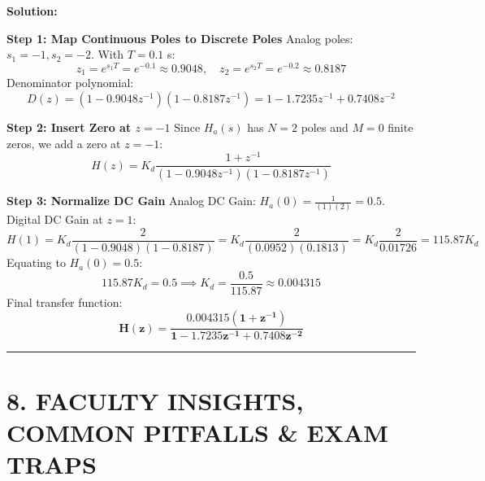\documentclass[11pt,a4paper]{article}
\begin{document}
\vspace{1mm}
\noindent\textbf{Solution:}

\noindent\textbf{Step 1: Map Continuous Poles to Discrete Poles}
Analog poles: $s_1 = -1, s_2 = -2$.
With $T = 0.1$ s:
\begin{equation}
z_1 = e^{s_1 T} = e^{-0.1} \approx 0.9048, \quad z_2 = e^{s_2 T} = e^{-0.2} \approx 0.8187
\end{equation}
Denominator polynomial:
\begin{equation}
D(z) = (1 - 0.9048 z^{-1})(1 - 0.8187 z^{-1}) = 1 - 1.7235 z^{-1} + 0.7408 z^{-2}
\end{equation}

\noindent\textbf{Step 2: Insert Zero at $z = -1$}
Since $H_a(s)$ has $N=2$ poles and $M=0$ finite zeros, we add a zero at $z = -1$:
\begin{equation}
H(z) = K_d \frac{1 + z^{-1}}{(1 - 0.9048 z^{-1})(1 - 0.8187 z^{-1})}
\end{equation}

\noindent\textbf{Step 3: Normalize DC Gain}
Analog DC Gain: $H_a(0) = \frac{1}{(1)(2)} = 0.5$.
Digital DC Gain at $z = 1$:
\begin{equation}
H(1) = K_d \frac{2}{(1 - 0.9048)(1 - 0.8187)} = K_d \frac{2}{(0.0952)(0.1813)} = K_d \frac{2}{0.01726} = 115.87 K_d
\end{equation}
Equating to $H_a(0) = 0.5$:
\begin{equation}
115.87 K_d = 0.5 \implies K_d = \frac{0.5}{115.87} \approx \mathbf{0.004315}
\end{equation}
Final transfer function:
\begin{equation}
\mathbf{H(z) = \frac{0.004315(1 + z^{-1})}{1 - 1.7235 z^{-1} + 0.7408 z^{-2}}}
\end{equation}

\noindent\rule{\textwidth}{0.5pt}

\section{8. FACULTY INSIGHTS, COMMON PITFALLS \& EXAM TRAPS}
\end{document}
